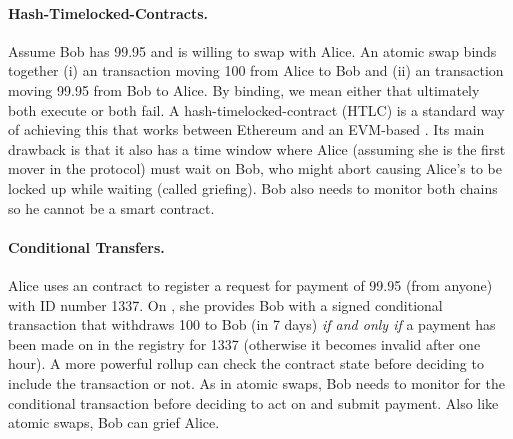 \paragraph{Hash-Timelocked-Contracts.} Assume Bob has 99.95 \ethone and is willing to swap with Alice. An atomic swap binds together (i) an \layertwo transaction moving 100 \ethtwo from Alice to Bob and (ii) an \layerone transaction moving 99.95 \ethone from Bob to Alice. By binding, we mean either that ultimately both execute or both fail. A hash-timelocked-contract (HTLC) is a standard way of achieving this that works between Ethereum and an EVM-based \layertwo. Its main drawback is that it also has a time window where Alice (assuming she is the first mover in the protocol) must wait on Bob, who might abort causing Alice's \ethtwo to be locked up while waiting (called griefing). Bob also needs to monitor both chains so he cannot be a smart contract. 

\paragraph{Conditional Transfers.} Alice uses an \layerone contract to register a request for payment of 99.95 \ethone (from anyone) with ID number 1337. On \layertwo,  she provides Bob with a signed conditional transaction that withdraws 100 \ethtwo to Bob (in 7 days) \textit{if and only if} a payment has been made on \layerone in the registry for 1337 (otherwise it becomes invalid after one hour). A more powerful rollup can check the \layerone contract state before deciding to include the \layertwo transaction or not. As in atomic swaps, Bob needs to monitor \layertwo for the conditional transaction before deciding to act on \layerone and submit payment. Also like atomic swaps, Bob can grief Alice.


